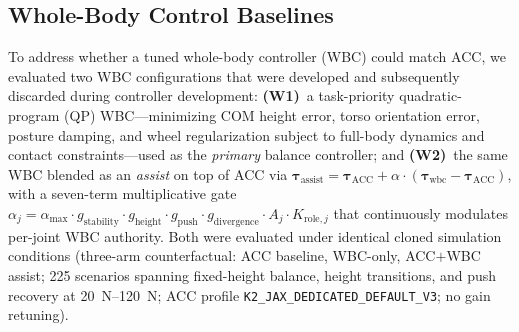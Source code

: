 %


\subsection{Whole-Body Control Baselines}
\label{sec:wbc}

To address whether a tuned whole-body controller (WBC) could match ACC, we evaluated two WBC configurations that were developed and subsequently discarded during controller development:
\textbf{(W1)}~a task-priority quadratic-program (QP) WBC---minimizing COM height error, torso orientation error, posture damping, and wheel regularization subject to full-body dynamics and contact constraints---used as the \emph{primary} balance controller; and
\textbf{(W2)}~the same WBC blended as an \emph{assist} on top of ACC via $\boldsymbol{\tau}_{\text{assist}} = \boldsymbol{\tau}_{\text{ACC}} + \alpha\!\cdot\!(\boldsymbol{\tau}_{\text{wbc}} - \boldsymbol{\tau}_{\text{ACC}})$, with a seven-term multiplicative gate $\alpha_{\!j} = \alpha_{\max}\!\cdot\!g_{\text{stability}}\!\cdot\!g_{\text{height}}\!\cdot\!g_{\text{push}}\!\cdot\!g_{\text{divergence}}\!\cdot\!A_j\!\cdot\!K_{\text{role},j}$ that continuously modulates per-joint WBC authority.
Both were evaluated under identical cloned simulation conditions (three-arm counterfactual: ACC baseline, WBC-only, ACC$+$WBC assist; 225 scenarios spanning fixed-height balance, height transitions, and push recovery at \SIrange{20}{120}{N}; ACC profile \texttt{K2\_JAX\_DEDICATED\_DEFAULT\_V3}; no gain retuning).

